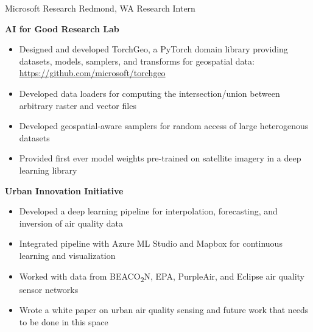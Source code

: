 
        {Microsoft Research}
        {Redmond, WA}
        {Research Intern}
        {}{
    \textbf{AI for Good Research Lab}
    \begin{itemize}
        \item Designed and developed TorchGeo, a PyTorch domain library providing datasets, models, samplers, and transforms for geospatial data: \url{https://github.com/microsoft/torchgeo}
        \item Developed data loaders for computing the intersection/union between arbitrary raster and vector files
        \item Developed geospatial-aware samplers for random access of large heterogenous datasets
        \item Provided first ever model weights pre-trained on satellite imagery in a deep learning library
    \end{itemize}
    \textbf{Urban Innovation Initiative}
    \begin{itemize}
        \item Developed a deep learning pipeline for interpolation, forecasting, and inversion of air quality data
        \item Integrated pipeline with Azure ML Studio and Mapbox for continuous learning and visualization
        \item Worked with data from BEACO\textsubscript{2}N, EPA, PurpleAir, and Eclipse air quality sensor networks
        \item Wrote a white paper on urban air quality sensing and future work that needs to be done in this space
    \end{itemize}
}
